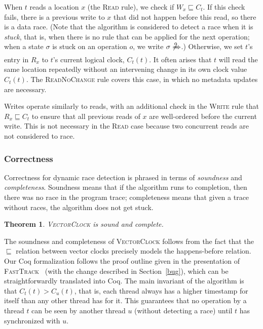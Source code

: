 \documentclass[preprint, 9pt]{sigplanconf}
\newcommand{\Tid}{t}
\newcommand{\Address}{x}
\newcommand{\VCFont}{}
\newcommand{\ThreadVC}[1]{\VCFont{C}_{#1}}
\newcommand{\ReadVC}[1]{\VCFont{R}_{#1}}
\newcommand{\WriteVC}[1]{\VCFont{W}_{#1}}
\newcommand{\VCalg}{\textsc{VectorClock}\xspace}
\newcommand{\FT}{\textsc{FastTrack}\xspace}
\newcommand{\Rule}[1]{\textsc{#1}}
\newcommand{\VCCompare}{\sqsubseteq}
\newtheorem{theorem}{Theorem}
\begin{document}
When $\Tid$ reads a location $\Address$ (the \Rule{Read} rule), we check if $\WriteVC{\Address} \VCCompare \ThreadVC{\Tid}$.  If this check fails, there is a previous write to $\Address$ that did not happen before this read, so there is a data race. (Note that the algorithm is considered to detect a race when it is \emph{stuck}, that is, when there is no rule that can be applied for the next operation; when a state $\sigma$ is stuck on an operation $o$, we write $\sigma \not\xRightarrow{o}$.) Otherwise, we set $\Tid$'s entry in $\ReadVC{\Address}$ to $\Tid$'s current logical clock, $\ThreadVC{\Tid}(\Tid)$.  It often arises that $\Tid$ will read the same location repeatedly without an intervening change in its own clock value $\ThreadVC{\Tid}(\Tid)$. The \Rule{ReadNoChange} rule covers this case, in which no metadata updates are necessary.

Writes operate similarly to reads, with an additional check in the \Rule{Write} rule that $\ReadVC{\Address} \VCCompare \ThreadVC{\Tid}$ to ensure that all previous reads of $\Address$ are well-ordered before the current write. This is not necessary in the \Rule{Read} case because two concurrent reads are not considered to race.


\subsubsection{Correctness}
Correctness for dynamic race detection is phrased in terms of \emph{soundness} and \emph{completeness}. Soundness means that if the algorithm runs to completion, then there was no race in the program trace; completeness means that given a trace without races, the algorithm does not get stuck.
\begin{theorem}\label{vc-correct}\VCalg is sound and complete.\end{theorem}
The soundness and completeness of \VCalg follows from the fact that the $\sqsubseteq$ relation between vector clocks precisely models the happens-before relation. Our Coq formalization follows the proof outline given in the presentation of \FT~\cite{fasttrack} (with the change described in Section~\ref{bug}), which can be straightforwardly translated into Coq. The main invariant of the algorithm is that $C_t(t) > C_u(t)$, that is, each thread always has a higher timestamp for itself than any other thread has for it. This guarantees that no operation by a thread $t$ can be seen by another thread $u$ (without detecting a race) until $t$ has synchronized with $u$.
\end{document}
